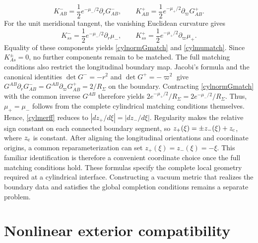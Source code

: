 \documentclass[amsmath,amsfonts,amssymb,aps,pra,superscriptaddress,10pt]{revtex4-2}
\numberwithin{equation}{section}
\theoremstyle{plain}
\theoremstyle{definition}
\theoremstyle{remark}
\theoremstyle{definition}
\begin{document}
\begin{equation}
K_{AB}^- =\frac{1}{2}e^{-\mu_-/2}\partial_rG_{AB}^-,\qquad
K_{AB}^+ =\frac{1}{2}e^{-\mu_+/2}\partial_\varpi G_{AB}^+.
\end{equation}
For the unit meridional tangent, the vanishing Euclidean curvature gives
\begin{equation}
K_{ss}^- =\frac{1}{2}e^{-\mu_-/2}\partial_r\mu_-,\qquad
K_{ss}^+ =\frac{1}{2}e^{-\mu_+/2}\partial_\varpi\mu_+.
\end{equation}
Equality of these components yields \eqref{cylnormGmatch} and \eqref{cylmumatch}. Since $K_{As}^\pm=0$, no further components remain to be matched. The full matching conditions also restrict the longitudinal boundary map. Jacobi's formula and the canonical identities $\det G^-=-r^2$ and $\det G^+=-\varpi^2$ give $G^{AB}\partial_r G_{AB}^-=G^{AB}\partial_\varpi G_{AB}^+=2/R_\Sigma$ on the boundary. Contracting \eqref{cylnormGmatch} with the common inverse $G^{AB}$ therefore yields
$2e^{-\mu_+/2}/R_\Sigma=2e^{-\mu_-/2}/R_\Sigma$. Thus, $\mu_+=\mu_-$ follows from the complete cylindrical matching conditions themselves. Hence, \eqref{cylmerff} reduces to $|dz_+/d\xi|=|dz_-/d\xi|$. Regularity makes the relative sign constant on each connected boundary segment, so $z_+(\xi)=\pm z_-(\xi)+z_{\rm{c}}$, where $z_{\rm{c}}$ is constant. After aligning the longitudinal orientations and coordinate origins, a common reparameterization can set $z_+(\xi)=z_-(\xi)=-\xi$. This familiar identification is therefore a convenient coordinate choice once the full matching conditions hold. These formulas specify the complete local geometry required at a cylindrical interface. Constructing a vacuum metric that realizes the boundary data and satisfies the global completion conditions remains a separate problem.

\section{Nonlinear exterior compatibility}\label{appnonlext}
\end{document}
